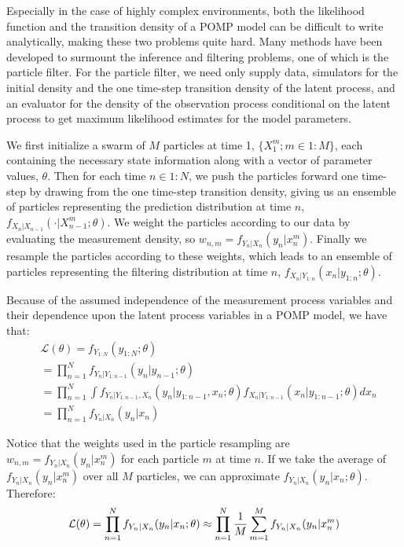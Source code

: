 \documentclass[12pt]{article}
\begin{document}
   Especially in the case of highly complex environments, both the likelihood function and the transition density of a POMP model can be difficult to write analytically, making these two problems quite hard. Many methods have been developed to surmount the inference and filtering problems, one of which is the particle filter. For the particle filter, we need only supply data, simulators for the initial density and the one time-step transition density of the latent process, and an evaluator for the density of the observation process conditional on the latent process to get maximum likelihood estimates for the model parameters. 
     
   We first initialize a swarm of $M$ particles at time 1, $\{ X_1^m; m \in 1:M \}$, each containing the necessary state information along with a vector of parameter values, $\theta$. Then for each time $n \in 1:N$, we push the particles forward one time-step by drawing from the one time-step transition density, giving us an ensemble of particles representing the prediction distribution at time $n$, $f_{X_n|X_{n-1}}(\cdot | X_{n-1}^m; \theta)$. We weight the particles according to our data by evaluating the measurement density, so $w_{n,m} = f_{Y_n|X_n}(y_n | x_n^m)$. Finally we resample the particles according to these weights, which leads to an ensemble of particles representing the filtering distribution at time $n$, $f_{X_n | Y_{1:n}}(x_n | y_{1:n}; \theta)$.
   
    Because of the assumed independence of the measurement process variables and their dependence upon the latent process variables in a POMP model, we have that:
         \begin{equation}
         \begin{split}
         & \mathcal{L}(\theta) = f_{Y_{1:N}}(y_{1:N}; \theta) \\
         & = \prod_{n=1}^N f_{Y_{n} | Y_{1:n-1}}(y_n | y_{n-1}; \theta) \\
         & = \prod_{n=1}^N \int f_{Y_n | Y_{1:n-1}, X_n}(y_n | y_{1:n-1}, x_n; \theta)f_{X_n | Y_{1:n-1}}(x_n | y_{1:n-1}; \theta) dx_n \\
         & = \prod_{n=1}^N f_{Y_n | X_n}(y_n | x_n)
         \end{split}
         \end{equation}
   
    Notice that the weights used in the particle resampling are $w_{n,m} = f_{Y_n|X_n}(y_n | x_n^m)$ for each particle $m$ at time $n$. If we take the average of $f_{Y_n|X_n}(y_n | x_n^m)$ over all $M$ particles, we can approximate $f_{Y_n|X_n}(y_n | x_n; \theta)$. Therefore: 
    \begin{equation}
    \mathcal{L}(\theta) = \prod_{n=1}^N f_{Y_n | X_n}(y_n | x_n; \theta) \approx \prod_{n=1}^N \frac{1}{M} \sum_{m = 1}^M f_{Y_n|X_n}(y_n | x_n^m) \\
    \end{equation}
   
\end{document}
